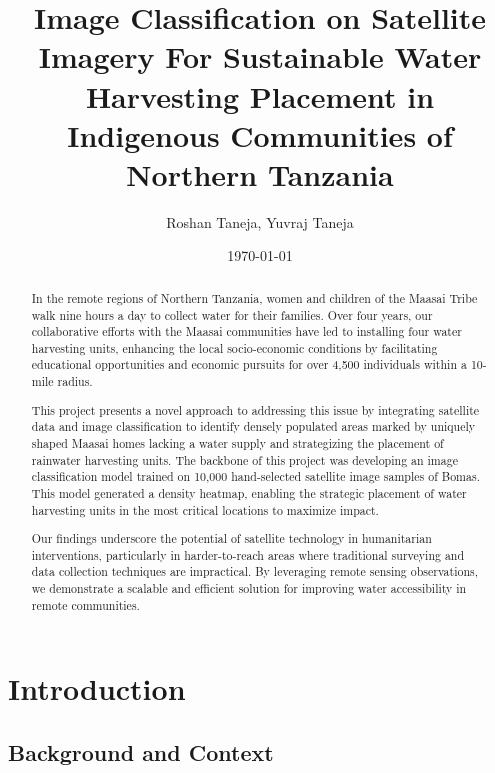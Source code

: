 \documentclass[10pt]{article}
\title{Image Classification on Satellite Imagery For Sustainable Water Harvesting Placement in Indigenous Communities of Northern Tanzania}
\author{Roshan Taneja, Yuvraj Taneja}
\date{\today}
\begin{document}
\maketitle

\begin{abstract}

In the remote regions of Northern Tanzania, women and children of the Maasai Tribe walk nine hours a day to collect water for their families. Over four years, our collaborative efforts with the Maasai communities have led to installing four water harvesting units, enhancing the local socio-economic conditions by facilitating educational opportunities and economic pursuits for over 4,500 individuals within a 10-mile radius.

This project presents a novel approach to addressing this issue by integrating satellite data and image classification to identify densely populated areas marked by uniquely shaped Maasai homes lacking a water supply and strategizing the placement of rainwater harvesting units. The backbone of this project was developing an image classification model trained on 10,000 hand-selected satellite image samples of Bomas. This model generated a density heatmap, enabling the strategic placement of water harvesting units in the most critical locations to maximize impact.

Our findings underscore the potential of satellite technology in humanitarian interventions, particularly in harder-to-reach areas where traditional surveying and data collection techniques are impractical. By leveraging remote sensing observations, we demonstrate a scalable and efficient solution for improving water accessibility in remote communities.
    
\end{abstract}


\section{Introduction}

\subsection{Background and Context}
\end{document}
